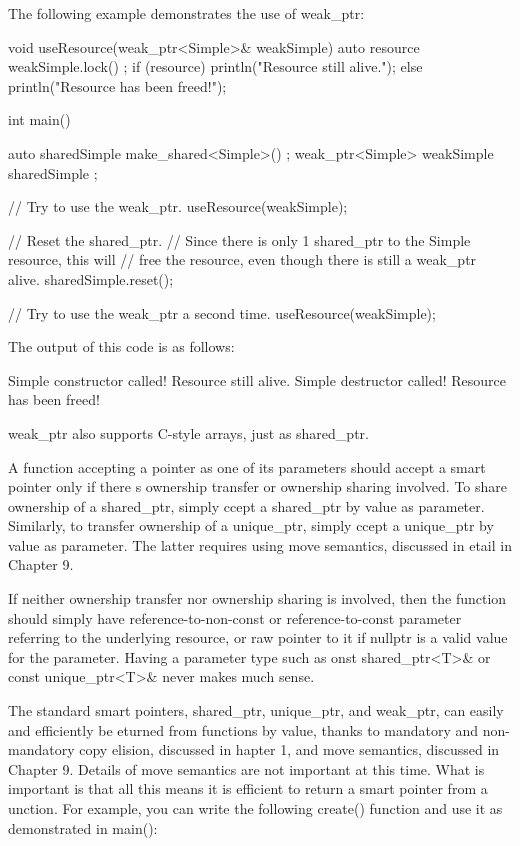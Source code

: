 The following example demonstrates the use of weak\_ptr:

\begin{cpp}
void useResource(weak_ptr<Simple>& weakSimple)
{
    auto resource { weakSimple.lock() };
    if (resource) { println("Resource still alive."); }
    else { println("Resource has been freed!"); }
}

int main()
{
    auto sharedSimple { make_shared<Simple>() };
    weak_ptr<Simple> weakSimple { sharedSimple };

    // Try to use the weak_ptr.
    useResource(weakSimple);

    // Reset the shared_ptr.
    // Since there is only 1 shared_ptr to the Simple resource, this will
    // free the resource, even though there is still a weak_ptr alive.
    sharedSimple.reset();

    // Try to use the weak_ptr a second time.
    useResource(weakSimple);
}
\end{cpp}

The output of this code is as follows:

\begin{shell}
Simple constructor called!
Resource still alive.
Simple destructor called!
Resource has been freed!
\end{shell}

weak\_ptr also supports C-style arrays, just as shared\_ptr.


A function accepting a pointer as one of its parameters should accept a smart pointer only if there s ownership transfer or ownership sharing involved. To share ownership of a shared\_ptr, simply ccept a shared\_ptr by value as parameter. Similarly, to transfer ownership of a unique\_ptr, simply ccept a unique\_ptr by value as parameter. The latter requires using move semantics, discussed in etail in Chapter 9.

If neither ownership transfer nor ownership sharing is involved, then the function should simply have  reference-to-non-const or reference-to-const parameter referring to the underlying resource, or  raw pointer to it if nullptr is a valid value for the parameter. Having a parameter type such as onst shared\_ptr<T>\& or const unique\_ptr<T>\& never makes much sense.


The standard smart pointers, shared\_ptr, unique\_ptr, and weak\_ptr, can easily and efficiently be eturned from functions by value, thanks to mandatory and non-mandatory copy elision, discussed in hapter 1, and move semantics, discussed in Chapter 9. Details of move semantics are not important at this time. What is important is that all this means it is efficient to return a smart pointer from a unction. For example, you can write the following create() function and use it as demonstrated in main():

